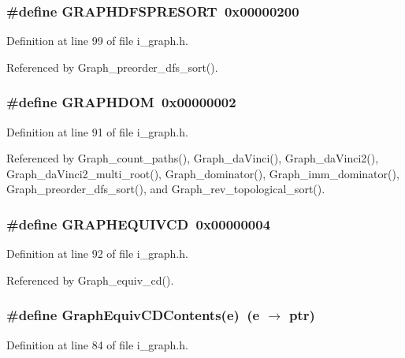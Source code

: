 \subsubsection{\setlength{\rightskip}{0pt plus 5cm}\#define GRAPHDFSPRESORT~0x00000200}\label{i__graph_8h_8920db6a27d0a737f1288fcfb7ecbd02}




Definition at line 99 of file i\_\-graph.h.

Referenced by Graph\_\-preorder\_\-dfs\_\-sort().
\subsubsection{\setlength{\rightskip}{0pt plus 5cm}\#define GRAPHDOM~0x00000002}\label{i__graph_8h_51f8de27d991704089096823bcee7782}




Definition at line 91 of file i\_\-graph.h.

Referenced by Graph\_\-count\_\-paths(), Graph\_\-da\-Vinci(), Graph\_\-da\-Vinci2(), Graph\_\-da\-Vinci2\_\-multi\_\-root(), Graph\_\-dominator(), Graph\_\-imm\_\-dominator(), Graph\_\-preorder\_\-dfs\_\-sort(), and Graph\_\-rev\_\-topological\_\-sort().
\subsubsection{\setlength{\rightskip}{0pt plus 5cm}\#define GRAPHEQUIVCD~0x00000004}\label{i__graph_8h_9374104fc4a9f17fc2ce62471b3ded05}




Definition at line 92 of file i\_\-graph.h.

Referenced by Graph\_\-equiv\_\-cd().
\subsubsection{\setlength{\rightskip}{0pt plus 5cm}\#define Graph\-Equiv\-CDContents(e)~(e $\rightarrow$ ptr)}\label{i__graph_8h_5429a182f6b93066d3dd8d090dcc04b8}




Definition at line 84 of file i\_\-graph.h.
